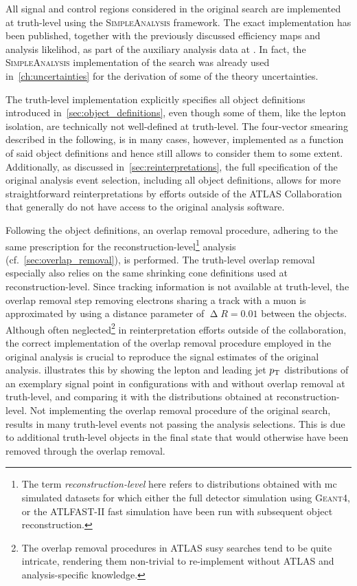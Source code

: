 All signal and control regions considered in the original \onelepton search are implemented at truth-level using the \textsc{SimpleAnalysis} framework.
The exact implementation has been published, together with the previously discussed efficiency maps and analysis likelihod, as part of the auxiliary analysis data at \cite{HEPdata_1Lbb}.
In fact, the \textsc{SimpleAnalysis} implementation of the search was already used in~\cref{ch:uncertainties} for the derivation of some of the theory uncertainties.

The truth-level implementation explicitly specifies all object definitions introduced in~\cref{sec:object_definitions}, even though some of them, like the lepton isolation, are technically not well-defined at truth-level.
The four-vector smearing described in the following, is in many cases, however, implemented as a function of said object definitions and hence still allows to consider them to some extent.
Additionally, as discussed in~\cref{sec:reinterpretations}, the full specification of the original analysis event selection, including all object definitions, allows for more straightforward reinterpretations by efforts outside of the ATLAS Collaboration that generally do not have access to the original analysis software.

Following the object definitions, an overlap removal procedure, adhering to the same prescription for the reconstruction-level\footnote{The term \textit{reconstruction-level} here refers to distributions obtained with \gls{mc} simulated datasets for which either the full detector simulation using \textsc{Geant4}, or the \textsc{ATLFAST-II} fast simulation have been run with subsequent object reconstruction.} analysis (cf.~\cref{sec:overlap_removal}), is performed. The truth-level overlap removal especially also relies on the same shrinking cone definitions used at reconstruction-level.
Since tracking information is not available at truth-level, the overlap removal step removing electrons sharing a track with a muon is approximated by using a distance parameter of $\upDelta R = 0.01$ between the objects.
Although often neglected\footnote{The overlap removal procedures in ATLAS \gls{susy} searches tend to be quite intricate, rendering them non-trivial to re-implement without ATLAS and analysis-specific knowledge.} in reinterpretation efforts outside of the collaboration, the correct implementation of the overlap removal procedure employed in the original analysis is crucial to reproduce the signal estimates of the original analysis.
 illustrates this by showing the lepton and leading jet $p_{\mathrm{T}}$ distributions of an exemplary signal point in configurations with and without overlap removal at truth-level, and comparing it with the distributions obtained at reconstruction-level.
Not implementing the overlap removal procedure of the original \onelepton search, results in many truth-level events not passing the analysis selections. This is due to additional truth-level objects in the final state that would otherwise have been removed through the overlap removal. 

